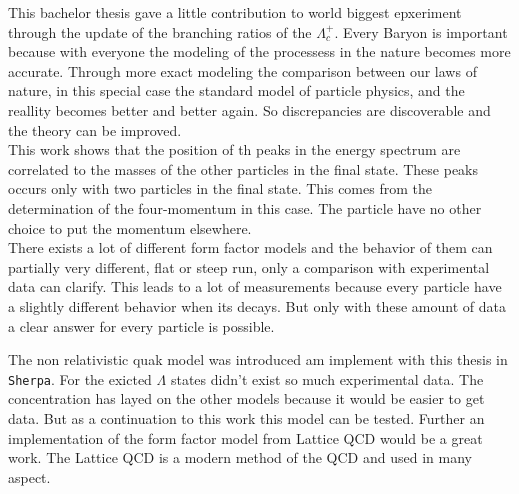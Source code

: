 This bachelor thesis gave a little contribution to world biggest epxeriment 
through the update of the branching ratios of the \(\Lambda_c^+\). Every 
Baryon is important because with everyone the modeling of the processess 
in the nature becomes more accurate. Through more exact modeling the 
comparison between our laws of nature, in this special case the 
standard model of particle physics, and the reallity becomes better and 
better again. So discrepancies are discoverable and the theory can be 
improved.\\
This work shows that the position of th peaks in the energy spectrum are 
correlated to the masses of the other particles in the final state. These peaks 
occurs only with two particles in the final state. This comes from the 
determination of the four-momentum in this case. The particle have no other 
choice to put the momentum elsewhere.\\
There exists a lot of different form factor models and the behavior of them 
can partially very different, flat or steep run, only a comparison with 
experimental data can clarify. This leads to a lot of measurements because 
every particle have a slightly different behavior when its decays. But 
only with these amount of data a clear answer for every particle is possible.
\par
\par
The non relativistic quak model \cite{NRQM} was introduced am implement with 
this thesis in \texttt{Sherpa}. For the exicted \(\Lambda\) states didn't 
exist so much experimental data. The concentration has layed on the 
other models because it would be easier to get data. But as a continuation to 
this work this model can be tested. Further an implementation of the form 
factor model from Lattice QCD \cite{Lattice_QCD} would be a great work. 
The Lattice QCD is a modern method of the QCD and used in many aspect.
